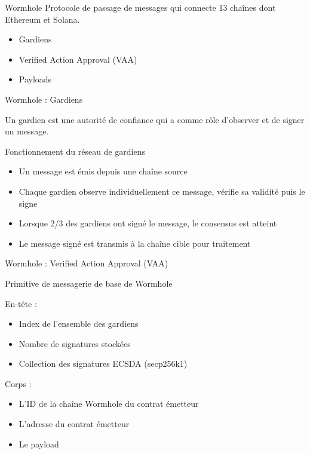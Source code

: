\begin{frame}{Wormhole}
Protocole de passage de messages qui connecte 13 chaînes dont Ethereum et Solana.
\newline

\begin{itemize}
    \item Gardiens
    \item Verified Action Approval (VAA)
    \item Payloads
\end{itemize}
\end{frame}

\begin{frame}{Wormhole : Gardiens}

Un gardien est une autorité de confiance qui a comme rôle d'observer et de signer un message.\newline

    \begin{block}{Fonctionnement du réseau de gardiens}
        \begin{itemize}
            \item Un message est émis depuis une chaîne source
            \item Chaque gardien observe individuellement ce message, vérifie sa validité puis le signe
            \item Lorsque 2/3 des gardiens ont signé le message, le consensus est atteint
            \item Le message signé est transmis à la chaîne cible pour traitement
        \end{itemize}
    \end{block}
\end{frame}

\begin{frame}{Wormhole : Verified Action Approval (VAA)}

Primitive de messagerie de base de Wormhole
\newline

En-tête :
\begin{itemize}
    \item Index de l'ensemble des gardiens
    \item Nombre de signatures stockées
    \item Collection des signatures ECSDA (secp256k1)
\end{itemize}

Corps : 
\begin{itemize}
    \item L'ID de la chaîne Wormhole du contrat émetteur
    \item L'adresse du contrat émetteur
    \item Le payload
\end{itemize}
\end{frame}

